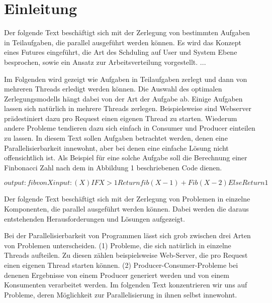 \section{Einleitung}



Der folgende Text beschäftigt sich mit der Zerlegung von bestimmten Aufgaben in Teilaufgaben, die parallel ausgeführt werden können. Es wird das Konzept eines Futures eingeführt, die Art des Schduling auf User und System Ebene besprochen, sowie ein Ansatz zur Arbeitsverteilung vorgestellt. ...

Im Folgenden wird gezeigt wie Aufgaben in Teilaufgaben zerlegt und dann von mehreren Threads erledigt werden können. Die Auswahl des optimalen Zerlegungsmodells hängt dabei von der Art der Aufgabe ab. Einige Aufgaben lassen sich natürlich in mehrere Threads zerlegen. Beispielsweise sind Webserver prädestiniert dazu pro Request einen eigenen Thread zu starten. Wiederum andere Probleme tendieren dazu sich einfach in Consumer und Producer einteilen zu lassen. In diesem Text sollen Aufgaben betrachtet werden, denen eine Parallelisierbarkeit innewohnt, aber bei denen eine einfache Lösung nicht offensichtlich ist.
Als Beispiel für eine solche Aufgabe soll die Berechnung einer Finbonacci Zahl nach dem in Abbildung 1 beschriebenen Code dienen. 

$
output: fib von X
input:(X)
IF X > 1 
	Return fib(X-1) + Fib(X-2)
Else
	Return 1
$
















Der folgende Text beschäftigt sich mit der Zerlegung von Problemen in einzelne Komponenten, die parallel ausgeführt werden können. Dabei werden die daraus entstehenden Herausforderungen und Lösungen aufgezeigt.

Bei der Parallelisierbarkeit von Programmen lässt sich grob zwischen drei Arten von Problemen unterscheiden. (1) Probleme, die sich natürlich in einzelne Threads aufteilen. Zu diesen zählen beispielsweise Web-Server, die pro Request einen eigenen Thread starten können. (2) Producer-Consumer-Probleme bei denenen Ergebnisse von einem Producer generiert werden und von einem Konsumenten verarbeitet werden. Im folgenden Text konzentrieren wir uns auf Probleme, deren Möglichkeit zur Parallelisierung in ihnen selbst innewohnt.

